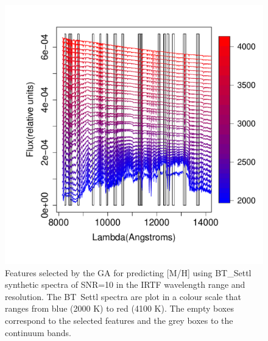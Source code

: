 \begin {figure}
 \centering
  \includegraphics[scale=0.55]{figs/BT-spectraAtIRTF-10-mh}
  \caption{Features selected by the GA for predicting [M/H] using
    BT\_Settl synthetic spectra of SNR=10 in the IRTF wavelength range
    and resolution. The BT\ Settl spectra are plot in a colour scale
    that ranges from blue (2000 K) to red (4100 K). The empty boxes
    correspond to the selected features and the grey boxes to the
    continuum bands.}
\label{fig:irtf-teff}
\end {figure}

